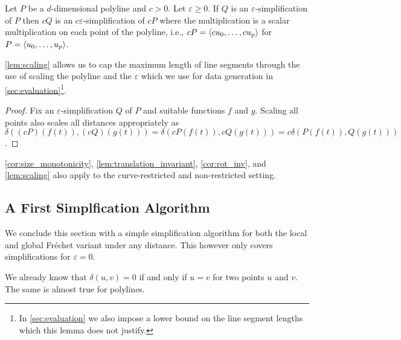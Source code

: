\begin{lemma}\label{lem:scaling}
	Let \(P\) be a \(d\)-dimensional polyline and \(c > 0\). Let \(\varepsilon \geq 0\). If \(Q\) is an \(\varepsilon\)-simplification of \(P\) then \(cQ\) is an \(c\varepsilon\)-simplification of \(cP\) where the multiplication is a scalar multiplication on  each point of the polyline, i.e., \(cP = \left\langle cu_0, \dots, cu_p\right\rangle\) for \(P = \left\langle u_0,\dots, u_p\right\rangle\).
\end{lemma}

\cref{lem:scaling} allows us to cap the maximum length of line segments through the use of scaling the polyline and the \(\varepsilon\) which we use for data generation in \cref{sec:evaluation}\footnote{In \cref{sec:evaluation} we also impose a lower bound on the line segment lengths which this lemma does not justify. }.

\begin{proof}
	Fix an \(\varepsilon\)-simplification \(Q\) of \(P\) and suitable functions \(f\) and \(g\). Scaling all points also scales all distances appropriately as \(\delta((cP)(f(t)), (cQ)(g(t))) = \delta(cP(f(t)), cQ(g(t))) = c\delta(P(f(t)), Q(g(t)))\).
\end{proof}

\begin{remark}
	\cref{cor:size_monotonicity}, \cref{lem:translation_invariant}, \cref{cor:rot_inv}, and \cref{lem:scaling} also apply to the curve-restricted and non-restricted setting.
\end{remark}


\subsection{A First Simplfication Algorithm}
We conclude this section with a simple simplification algorithm for both the local and global Fréchet variant under any distance. This however only covers simplifications for \(\varepsilon = 0\).

We already know that \(\delta(u, v) = 0\) if and only if \(u = v\) for two points \(u\) and \(v\). The same is almost true for polylines. 

